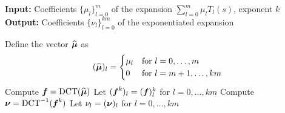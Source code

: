 \hspace*{\algorithmicindent} \textbf{Input:} Coefficients $\{ \mu_l \}_{l=0}^m$ of the expansion $\sum_{l=0}^m \mu_l T_l(s)$, exponent $k$ \\
\hspace*{\algorithmicindent} \textbf{Output:} Coefficients $\{ \nu_l \}_{l=0}^{km}$ of the exponentiated expansion
\begin{algorithmic}[1]
    \State Define the vector $\widehat{\boldsymbol{\mu}}$ as
        \begin{equation}
            (\widehat{\boldsymbol{\mu}})_l = \begin{cases} \mu_l &\text{for $l=0, \dots, m$} \\
                                                     0 &\text{for $l=m+1, \dots, km$} \end{cases}
        \end{equation}
    \State Compute $\boldsymbol{f} = \operatorname{DCT}(\widehat{\boldsymbol{\mu}})$
    \State Let $(\boldsymbol{f}^{k})_l = (\boldsymbol{f})_l^k$ for $l=0, \dots, km$
    \State Compute $\boldsymbol{\nu} = \operatorname{DCT}^{-1}(\boldsymbol{f}^{k})$
    \State Let $\nu_l = (\boldsymbol{\nu})_l$ for $l=0, \dots, km$
\end{algorithmic}
